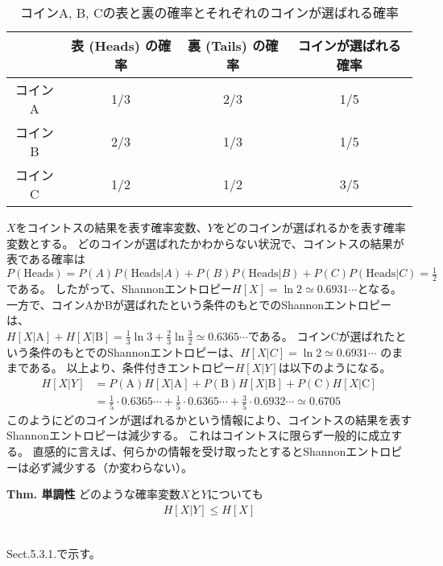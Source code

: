 \documentclass{ltjsarticle}
\begin{document}
\begin{table}[H]
  \centering
  \begin{tabular}{|c|c|c|c|}
  \hline
         & 表 (Heads) の確率 & 裏 (Tails) の確率 & コインが選ばれる確率 \\ \hline
  コインA & 1/3 & 2/3 & 1/5 \\ \hline
  コインB & 2/3 & 1/3 & 1/5 \\ \hline
  コインC & 1/2 & 1/2 & 3/5 \\ \hline
  \end{tabular}
  \caption{コインA, B, Cの表と裏の確率とそれぞれのコインが選ばれる確率}
  \label{table:coins}
\end{table}

$X$をコイントスの結果を表す確率変数、$Y$をどのコインが選ばれるかを表す確率変数とする。
どのコインが選ばれたかわからない状況で、コイントスの結果が表である確率は\\
$P(\mathrm{Heads}) = P(A) P(\mathrm{Heads}|A) + P(B) P(\mathrm{Heads}|B) + P(C) P(\mathrm{Heads}|C) = \frac{1}{2}$である。
したがって、Shannonエントロピー$H[X]=\ln{2} \simeq 0.6931 \cdots$となる。\\
一方で、コインAかBが選ばれたという条件のもとでのShannonエントロピーは、\\
$H[X|\mathrm{A}] + H[X|\mathrm{B}] = \frac{1}{3} \ln{3} +\frac{2}{3} \ln{\frac{3}{2}} \simeq 0.6365 \cdots$である。
コインCが選ばれたという条件のもとでのShannonエントロピーは、$H[X|C] = \ln{2} \simeq 0.6931 \cdots$ のままである。
以上より、条件付きエントロピー$H[X|Y]$は以下のようになる。
\begin{align}
  H[X|Y] &= P(\mathrm{A})H[X|\mathrm{A}] + P(\mathrm{B})H[X|\mathrm{B}] + P(\mathrm{C})H[X|\mathrm{C}]\\
  &= \frac{1}{5} \cdot 0.6365 \cdots + \frac{1}{5} \cdot 0.6365 \cdots + \frac{3}{5} \cdot 0.6932 \cdots \simeq 0.6705
\end{align}
このようにどのコインが選ばれるかという情報により、コイントスの結果を表すShannonエントロピーは減少する。
これはコイントスに限らず一般的に成立する。
直感的に言えば、何らかの情報を受け取ったとするとShannonエントロピーは必ず減少する（か変わらない）。
\begin{itembox}[l]{\textbf{Thm. 単調性}}
  どのような確率変数$X$と$Y$についても
  \begin{align}
    H[X|Y] \leq H[X]
  \end{align}
\end{itembox}

\\
Sect.5.3.1.で示す。
\end{document}

